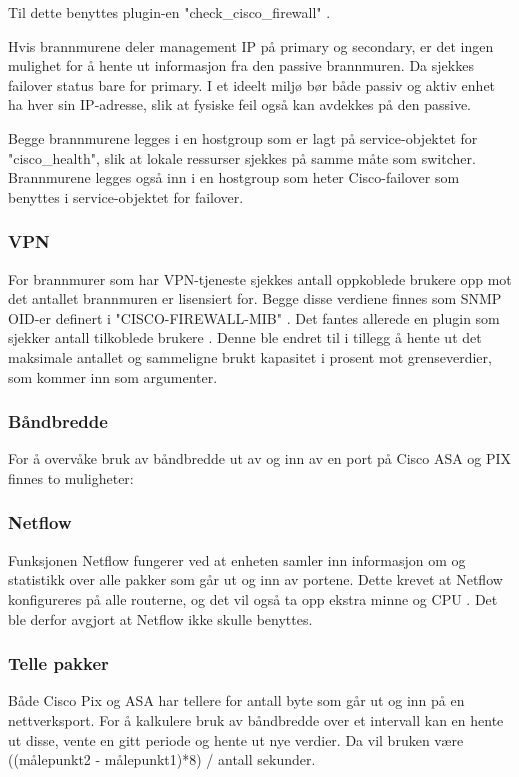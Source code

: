 Til dette benyttes plugin-en "check\_cisco\_firewall" \cite{checkciscofirewall}.

Hvis brannmurene deler management IP på primary og secondary, er det ingen mulighet for å hente ut informasjon fra den passive brannmuren. Da sjekkes failover status bare for primary. I et ideelt miljø bør både passiv og aktiv enhet ha hver sin IP-adresse, slik at fysiske feil også kan avdekkes på den passive.

Begge brannmurene legges i en hostgroup som er lagt på service-objektet for "cisco\_health", slik at lokale ressurser sjekkes på samme måte som switcher. Brannmurene legges også inn i en hostgroup som heter Cisco-failover som benyttes i service-objektet for failover.

\subsubsection{VPN}

For brannmurer som har VPN-tjeneste sjekkes antall oppkoblede brukere opp mot det antallet brannmuren er lisensiert for. Begge disse verdiene finnes som SNMP OID-er definert i "CISCO-FIREWALL-MIB" \cite{cisco_fw_mib}. Det fantes allerede en plugin som sjekker antall tilkoblede brukere \cite{checkciscovpn}. Denne ble endret til i tillegg å hente ut det maksimale antallet og sammeligne brukt kapasitet i prosent mot grenseverdier, som kommer inn som argumenter.

\subsubsection{Båndbredde}
For å overvåke bruk av båndbredde ut av og inn av en port på Cisco ASA og PIX finnes to muligheter:

\subsubsection*{Netflow}
Funksjonen Netflow \cite{ciscoiosnetflow} fungerer ved at enheten samler inn informasjon om og statistikk over alle pakker som går ut og inn av portene. Dette krevet at Netflow konfigureres på alle routerne, og det vil også ta opp ekstra minne og CPU \cite{cisconetflowperf}. Det ble derfor avgjort at Netflow ikke skulle benyttes.

\subsubsection*{Telle pakker}
Både Cisco Pix og ASA har tellere for antall byte som går ut og inn på en nettverksport. For å kalkulere bruk av båndbredde over et intervall kan en hente ut disse, vente en gitt periode og hente ut nye verdier. Da vil bruken være ((målepunkt2 - målepunkt1)*8) / antall sekunder.

